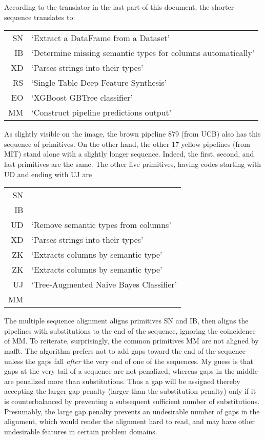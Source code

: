 \documentclass{article}
\begin{document}
According to the translator in the last part of this document, the
shorter sequence translates to:

\begin{tabular}{rl}
SN & `Extract a DataFrame from a Dataset' \\
IB & `Determine missing semantic types for columns automatically' \\
XD & `Parses strings into their types' \\
RS & `Single Table Deep Feature Synthesis' \\
EO & `XGBoost GBTree classifier' \\
MM & `Construct pipeline predictions output'
\end{tabular}

As slightly visible on the image, the brown pipeline 879 (from UCB)
also has this sequence of primitives.  On the other hand, the other 17
yellow pipelines (from MIT) stand alone with a slightly longer
sequence.  Indeed, the first, second, and last primitives are the
same.  The other five primitives, having codes starting with UD and
ending with UJ are

\begin{tabular}{rl}
  SN & \\
  IB & \\
UD & `Remove semantic types from columns' \\
XD & `Parses strings into their types' \\
ZK & `Extracts columns by semantic type' \\
ZK & `Extracts columns by semantic type' \\
UJ & `Tree-Augmented Naive Bayes Classifier' \\
MM & 
\end{tabular}

The multiple sequence alignment aligns primitives SN and IB, then
aligns the pipelines with substitutions to the end of the sequence,
ignoring the coincidence of MM. To reiterate, surprisingly, the common
primitives MM are not aligned by mafft.  The algorithm prefers not to
add gaps toward the end of the sequence unless the gaps fall {\em
  after} the very end of one of the sequences.  My guess is that gaps
at the very tail of a sequence are not penalized, whereas gaps in the
middle are penalized more than substitutions.  Thus a gap will be
assigned thereby accepting the larger gap penalty (larger than the
substitution penalty) only if it is counterbalanced by preventing a
subsequent sufficient number of substitutions.  Presumably, the large
gap penalty prevents an undesirable number of gaps in the alignment,
which would render the alignment hard to read, and may have other
undesirable features in certain problem domains.
\end{document}
